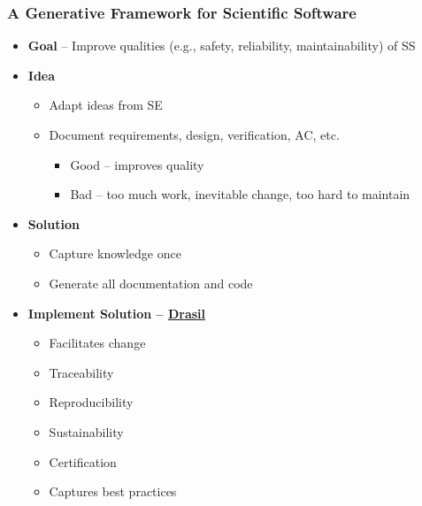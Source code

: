 \documentclass{beamer}
\begin{document}

\begin{frame}

\frametitle{A Generative Framework for Scientific Software}

\begin{itemize}
\item \textbf{Goal} -- Improve qualities (e.g., safety, reliability, maintainability) of SS
\item \textbf{Idea}
  \begin{itemize}
  \item Adapt ideas from SE
  \item Document requirements, design, verification, AC, etc.
    \begin{itemize}
    \item Good -- improves quality
    \item Bad -- too much work, inevitable change, too hard to maintain
    \end{itemize}
  \end{itemize}
\item \textbf{Solution}
\begin{itemize}
\item Capture knowledge once
\item Generate all documentation and code
\end{itemize}
\item \textbf{Implement Solution --
    \href{https://github.com/JacquesCarette/Drasil} {Drasil}}
  \begin{itemize}
  \item Facilitates change
  \item Traceability
  \item Reproducibility
  \item Sustainability
  \item Certification
  \item Captures best practices
  \end{itemize}
\end{itemize}

\end{frame}

\end{document}
